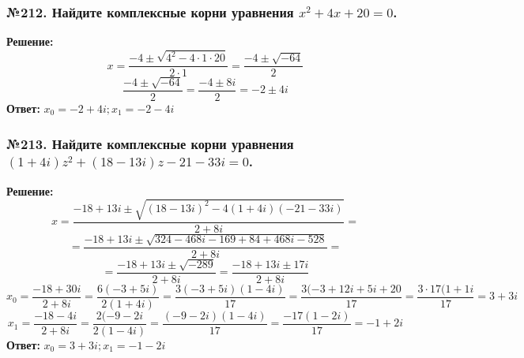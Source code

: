\documentclass[a4paper]{article}
\begin{document}
\subsubsection*{№212. Найдите комплексные корни уравнения $x^2+4x+20=0$.}
\textbf{Решение:}
\[x=\frac{-4\pm\sqrt{4^2-4\cdot1\cdot20}}{2\cdot1}=\frac{-4\pm\sqrt{-64}}{2}\]
\[\frac{-4\pm\sqrt{-64}}{2}=\frac{-4\pm8i}{2}=-2\pm4i\]
\textbf{Ответ:} $x_0=-2+4i; x_1=-2-4i$

\subsubsection*{№213. Найдите комплексные корни уравнения $(1+4i)z^2+(18-13i)z-21-33i=0$.}
\textbf{Решение:}
\[x=\frac{-18+13i\pm\sqrt{(18-13i)^2-4(1+4i)(-21-33i)}}{2+8i}=\]
\[=\frac{-18+13i\pm\sqrt{324-468i-169+84+468i-528}}{2+8i}=\]
\[=\frac{-18+13i\pm\sqrt{-289}}{2+8i}=\frac{-18+13i\pm17i}{2+8i}\]
\[x_0=\frac{-18+30i}{2+8i}=\frac{6(-3+5i)}{2(1+4i)}=\frac{3(-3+5i)(1-4i)}{17}=\frac{3(-3+12i+5i+20}{17}=\frac{3\cdot17(1+1i}{17}=3+3i\]
\[x_1=\frac{-18-4i}{2+8i}=\frac{2(-9-2i}{2(1-4i)}=\frac{(-9-2i)(1-4i)}{17}=\frac{-17(1-2i)}{17}=-1+2i\]
\textbf{Ответ:} $\displaystyle x_0=3+3i; x_1=-1-2i$

\end{document}
